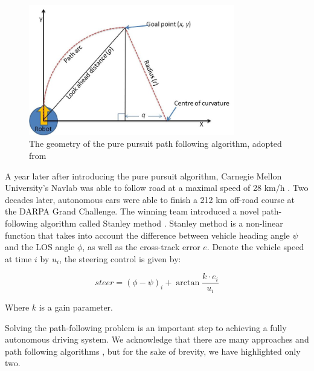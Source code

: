 \documentclass{ctuthesis/ctuthesis}
\begin{document}
\begin{figure}[h!]
    \centering
    \includegraphics[width=0.8\textwidth]{images/Geometry-of-the-pure-pursuit-algorithm.jpg}
    
    \caption{The geometry of the pure pursuit path following algorithm, adopted from \protect\cite{nice_picture}}\label{f:pure_pursuit}
\end{figure}


A year later after introducing the pure pursuit algorithm, Carnegie Mellon University's Navlab was able to follow road at a maximal speed of 28 km/h \cite{navlab1}. Two decades later, autonomous cars were able to finish a 212 km off-road course at the DARPA Grand Challenge. The winning team introduced a novel path-following algorithm called Stanley method \cite{stanley_method}. Stanley method is a non-linear function that takes into account the difference between vehicle heading angle $\psi$ and the LOS angle $\phi$, as well as the cross-track error $e$. Denote the vehicle speed at time $i$ by $u_i$, the steering control is given by:

\begin{equation}
steer = (\phi- \psi)_i + \arctan{\dfrac{k\cdot e_i}{u_i}}
\end{equation}

Where $k$ is a gain parameter.\par


Solving the path-following problem is an important step to achieving a fully autonomous driving system. We acknowledge that there are many approaches and path following algorithms \cite{path_following_overview}, but for the sake of brevity, we have highlighted only two.
\end{document}
